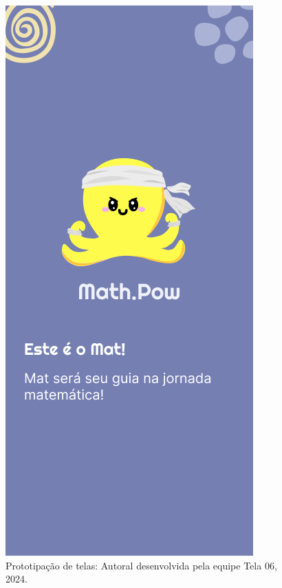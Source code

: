 \documentclass[12pt, openany, oneside, a4paper, english, brazil]{abntex2}   %
\begin{document}
\begin{figure}
    \centering
    \includegraphics[scale=0.7]{figuras/Math.Pow App/Initial.png}
    \caption{Prototipação de telas: Autoral desenvolvida pela equipe Tela 06, 2024.}
    \label{fig:nome-da-imagem}
\end{figure}
\end{document}
